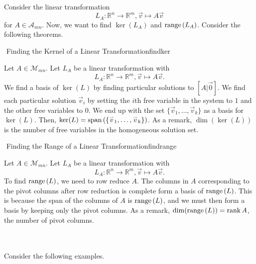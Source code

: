         \\
        Consider the linear transformation
        \begin{equation*}
            L_A:\mathbb{R}^n\to\mathbb{R}^m, \vec{v}\mapsto A\vec{v}
        \end{equation*}
        for \(A\in\mathcal{A}_{mn}\). Now, we want to find \(\ker(L_A)\) and \(\text{range\,}(L_A)\). Consider the following theorems.
        \begin{theorem}{\Stop\,\,Finding the Kernel of a Linear Transformation}{findker}

            Let \(A\in\mathcal{M}_{mn}\). Let \(L_A\) be a linear transformation with
            \begin{equation*}
                L_A:\mathbb{R}^n\to\mathbb{R}^m, \vec{v}\mapsto A\vec{v}.
            \end{equation*}
            We find a basis of \(\ker(L)\) by finding particular solutions to \([A|\vec{0}]\). We find each particular solution \(\vec{v}_i\) by setting the \(i\)th free variable in the system to \(1\) and the other free variables to \(0\). We end up with the set \(\{\vec{v}_1,\ldots,\vec{v}_k\}\) as a basis for \(\ker(L)\). Then, \(\ker(L)=\text{span\,}(\{\overset{_{\rightharpoonup}}{v}_1,\ldots,\overset{_{\rightharpoonup}}{v}_k\})\). As a remark, \(\dim(\ker(L))\) is the number of free variables in the homogeneous solution set.
        \end{theorem}
        \begin{theorem}{\Stop\,\,Finding the Range of a Linear Transformation}{findrange}

            Let \(A\in\mathcal{M}_{mn}\). Let \(L_A\) be a linear transformation with
            \begin{equation*}
                L_A:\mathbb{R}^n\to\mathbb{R}^m, \vec{v}\mapsto A\vec{v}.
            \end{equation*}
            To find \(\text{range\,}(L)\), we need to row reduce \(A\). The columns in \(A\) corresponding to the pivot columns after row reduction is complete form a basis of \(\text{range\,}(L)\). This is because the span of the columns of \(A\) is \(\text{range\,}(L)\), and we must then form a basis by keeping only the pivot columns. As a remark, \(\dim(\text{range\,}(L))=\text{rank\,} A\), the number of pivot columns.

        \end{theorem}
        \pagebreak
        \vphantom
        \\
        \\
        Consider the following examples.
